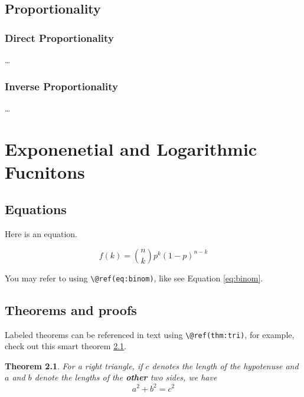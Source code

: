 \documentclass[
]{book}
\newtheorem{theorem}{Theorem}[chapter]
\theoremstyle{definition}
\theoremstyle{definition}
\theoremstyle{definition}
\theoremstyle{definition}
\theoremstyle{remark}
\begin{document}
\hypertarget{proportionality}{%
\section{Proportionality}\label{proportionality}}

\hypertarget{direct-proportionality}{%
\subsection{Direct Proportionality}\label{direct-proportionality}}

\ldots{}

\hypertarget{inverse-proportionality}{%
\subsection{Inverse Proportionality}\label{inverse-proportionality}}

\ldots{}

\hypertarget{exponenetial-and-logarithmic-fucnitons}{%
\chapter{Exponenetial and Logarithmic Fucnitons}\label{exponenetial-and-logarithmic-fucnitons}}

\hypertarget{equations}{%
\section{Equations}\label{equations}}

Here is an equation.

\begin{equation} 
  f\left(k\right) = \binom{n}{k} p^k\left(1-p\right)^{n-k}
  \label{eq:binom}
\end{equation}

You may refer to using \texttt{\textbackslash{}@ref(eq:binom)}, like see Equation \eqref{eq:binom}.

\hypertarget{theorems-and-proofs}{%
\section{Theorems and proofs}\label{theorems-and-proofs}}

Labeled theorems can be referenced in text using \texttt{\textbackslash{}@ref(thm:tri)}, for example, check out this smart theorem \ref{thm:tri}.

\begin{theorem}
\protect\hypertarget{thm:tri}{}\label{thm:tri}For a right triangle, if \(c\) denotes the \emph{length} of the hypotenuse
and \(a\) and \(b\) denote the lengths of the \textbf{other} two sides, we have
\[a^2 + b^2 = c^2\]
\end{theorem}
\end{document}
